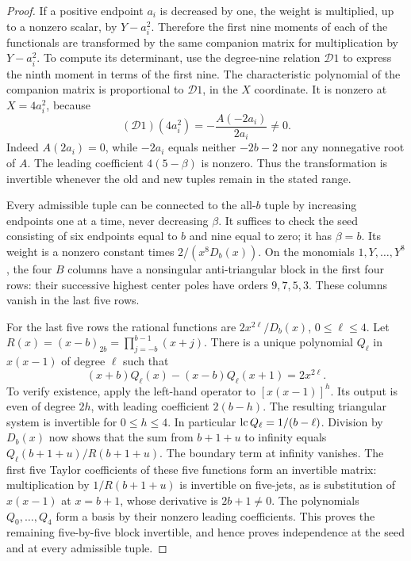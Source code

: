 \documentclass[11pt]{article}
\theoremstyle{definition}\newtheorem{definition}[theorem]{Definition}
\theoremstyle{remark}\newtheorem{remark}[theorem]{Remark}
\begin{document}
\begin{proof}
If a positive endpoint $a_i$ is decreased by one, the weight is multiplied,
up to a nonzero scalar, by $Y-a_i^2$.  Therefore the first nine moments
of each of the functionals are transformed by the same companion matrix
for multiplication by $Y-a_i^2$.  To compute its determinant, use the
degree-nine relation $\mathcal D1$ to express the ninth moment in terms
of the first nine.  The characteristic polynomial of the companion
matrix is proportional to $\mathcal D1$, in the $X$ coordinate.
It is nonzero at $X=4a_i^2$, because
\[
 (\mathcal D1)(4a_i^2)=-\frac{A(-2a_i)}{2a_i}\ne0.
\]
Indeed $A(2a_i)=0$, while $-2a_i$ equals neither $-2b-2$ nor any
nonnegative root of $A$.  The leading coefficient $4(5-\beta)$ is
nonzero.  Thus the transformation is invertible whenever the old and
new tuples remain in the stated range.

Every admissible tuple can be connected to the all-$b$ tuple by increasing
endpoints one at a time, never decreasing $\beta$.  It suffices to check
the seed consisting of six endpoints equal to $b$ and nine equal to zero;
it has $\beta=b$.  Its weight is a nonzero constant times
$2/(x^8D_b(x))$.  On the monomials $1,Y,\ldots,Y^8$, the four $B$ columns
have a nonsingular anti-triangular block in the first four rows: their
successive highest center poles have orders $9,7,5,3$.  These columns
vanish in the last five rows.

For the last five rows the rational functions are
$2x^{2\ell}/D_b(x)$, $0\le\ell\le4$.  Let
$R(x)=(x-b)_{2b}=\prod_{j=-b}^{b-1}(x+j)$.
There is a unique polynomial $Q_\ell$ in $x(x-1)$ of degree $\ell$ such that
\begin{equation}\label{eq:seed-antidifference}
 (x+b)Q_\ell(x)-(x-b)Q_\ell(x+1)=2x^{2\ell}.
\end{equation}
To verify existence, apply the left-hand operator to $[x(x-1)]^h$.
Its output is even of degree $2h$, with leading coefficient $2(b-h)$.
The resulting triangular system is invertible for $0\le h\le4$.
In particular $\operatorname{lc} Q_\ell=1/(b-\ell)$.  Division by $D_b(x)$ now shows
that the sum from $b+1+u$ to infinity equals
$Q_\ell(b+1+u)/R(b+1+u)$.  The boundary term at infinity vanishes.
The first five Taylor coefficients of these five functions form an
invertible matrix: multiplication by $1/R(b+1+u)$ is invertible on
five-jets, as is substitution of $x(x-1)$ at $x=b+1$, whose derivative
is $2b+1\ne0$.  The polynomials $Q_0,\ldots,Q_4$ form a basis by their
nonzero leading coefficients.  This proves the remaining five-by-five
block invertible, and hence proves independence at the seed and at every
admissible tuple.
\end{proof}






\end{document}
